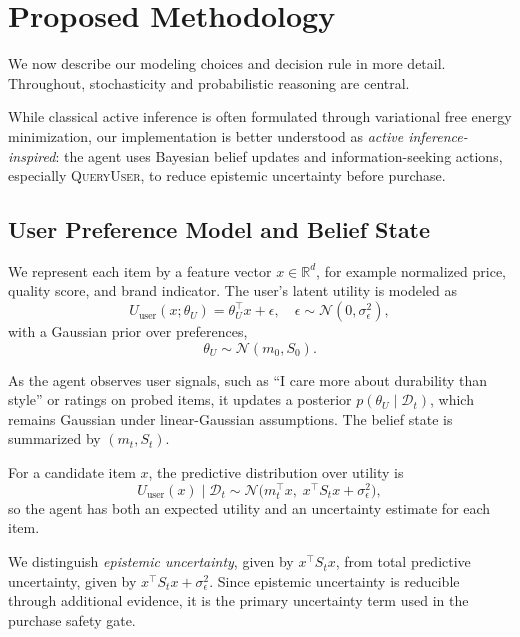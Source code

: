 \documentclass[11pt]{article}
\begin{document}
\section{Proposed Methodology}

We now describe our modeling choices and decision rule in more detail. Throughout, stochasticity and probabilistic reasoning are central.

While classical active inference is often formulated through variational free energy minimization, our implementation is better understood as \emph{active inference-inspired}: the agent uses Bayesian belief updates and information-seeking actions, especially \textsc{QueryUser}, to reduce epistemic uncertainty before purchase.

\subsection{User Preference Model and Belief State}

We represent each item by a feature vector $x \in \mathbb{R}^d$, for example normalized price, quality score, and brand indicator. The user's latent utility is modeled as
\begin{equation}
U_{\text{user}}(x; \theta_U) = \theta_U^\top x + \epsilon, \quad \epsilon \sim \mathcal{N}(0, \sigma_\epsilon^2),
\end{equation}
with a Gaussian prior over preferences,
\begin{equation}
\theta_U \sim \mathcal{N}(m_0, S_0).
\end{equation}

As the agent observes user signals, such as ``I care more about durability than style'' or ratings on probed items, it updates a posterior $p(\theta_U \mid \mathcal{D}_t)$, which remains Gaussian under linear-Gaussian assumptions. The belief state is summarized by $(m_t, S_t)$.

For a candidate item $x$, the predictive distribution over utility is
\begin{equation}
U_{\text{user}}(x) \mid \mathcal{D}_t \sim \mathcal{N}\big(m_t^\top x,\; x^\top S_t x + \sigma_\epsilon^2\big),
\end{equation}
so the agent has both an expected utility and an uncertainty estimate for each item.

We distinguish \emph{epistemic uncertainty}, given by $x^\top S_t x$, from total predictive uncertainty, given by $x^\top S_t x + \sigma_\epsilon^2$. Since epistemic uncertainty is reducible through additional evidence, it is the primary uncertainty term used in the purchase safety gate.
\end{document}

